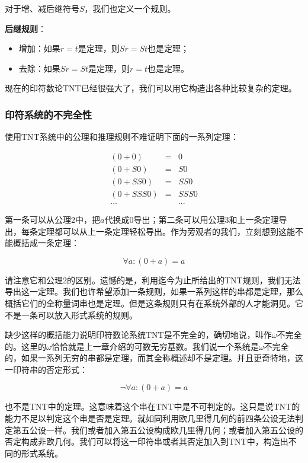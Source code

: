 \documentclass{article}
\begin{document}
对于增、减后继符号$S$，我们也定义一个规则。

\textbf{后继规则}：
\begin{itemize}
\item 增加：如果$r = t$是定理，则$Sr = St$也是定理；
\item 去除：如果$Sr = St$是定理，则$r = t$也是定理。
\end{itemize}

现在的印符数论TNT已经很强大了，我们可以用它构造出各种比较复杂的定理。

\begin{Exercise}
\end{Exercise}

\subsubsection{印符系统的不完全性}

使用TNT系统中的公理和推理规则不难证明下面的一系列定理：

\[
\begin{array}{rcl}
(0 + 0) & = & 0 \\
(0 + S0) & = & S0 \\
(0 + SS0) & = & SS0 \\
(0 + SSS0) & = & SSS0 \\
... & & ...
\end{array}
\]

第一条可以从公理2中，把$a$代换成0导出；第二条可以用公理3和上一条定理导出，每条定理都可以从上一条定理轻松导出。作为旁观者的我们，立刻想到这能不能概括成一条定理：

\[
\forall a: (0 + a) = a
\]

请注意它和公理2的区别。遗憾的是，利用迄今为止所给出的TNT规则，我们无法导出这一定理。我们也许希望添加一条规则，如果一系列这样的串都是定理，那么概括它们的全称量词串也是定理。但是这条规则只有在系统外部的人才能洞见。它不是一条可以放入形式系统的规则。

缺少这样的概括能力说明印符数论系统TNT是不完全的，确切地说，叫作$\omega$不完全的。这里的$\omega$恰恰就是上一章介绍的可数无穷基数。我们说一个系统是$\omega$不完全的，如果一系列无穷的串都是定理，而其全称概述却不是定理。并且更奇特地，这一印符串的否定形式：

\[
\lnot \forall a: (0 + a) = a
\]

也不是TNT中的定理。这意味着这个串在TNT中是不可判定的。这只是说TNT的能力不足以判定这个串是否是定理。就如同利用欧几里得几何的前四条公设无法判定第五公设一样。我们或者加入第五公设构成欧几里得几何；或者加入第五公设的否定构成非欧几何。我们可以将这一印符串或者其否定加入到TNT中，构造出不同的形式系统。
\end{document}
